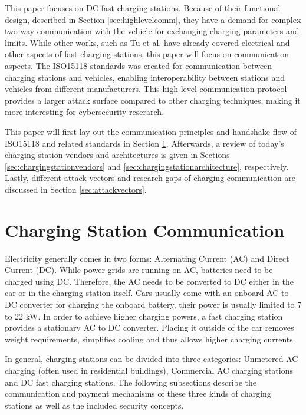 \documentclass[conference,flushend]{iaria} %
\begin{document}
This paper focuses on DC fast charging stations. Because of their functional design, described in Section \ref{sec:highlevelcomm}, they have a demand for complex two-way communication with the vehicle for exchanging charging parameters and limits.
While other works, such as Tu et al. \cite{tu_extreme_2019} have already covered electrical and other aspects of fast charging stations, this paper will focus on communication aspects.
The ISO15118 standards \cite{isoiec_isoiec_2012, isoiec_isoiec_2012-1} was created for communication between charging stations and vehicles, enabling interoperability between stations and vehicles from different manufacturers.
This high level communication protocol provides a larger attack surface compared to other charging techniques, making it more interesting for cybersecurity reserarch.

This paper will first lay out the communication principles and handshake flow of ISO15118 and related standards in Section \ref{sec:chargingcommoverview}.
Afterwards, a review of today's charging station vendors and architectures is given in Sections \ref{sec:chargingstationvendors} and \ref{sec:chargingstationarchitecture}, respectively.
Lastly, different attack vectors and research gaps of charging communication are discussed in Section \ref{sec:attackvectors}.

\section{Charging Station Communication} \label{sec:chargingcommoverview}
Electricity generally comes in two forms: Alternating Current (AC) and Direct Current (DC).
While power grids are running on AC, batteries need to be charged using DC.
Therefore, the AC needs to be converted to DC either in the car or in the charging station itself.
Cars usually come with an onboard AC to DC converter for charging the onboard battery, their power is usually limited to 7 to 22 kW.
In order to achieve higher charging powers, a fast charging station provides a stationary AC to DC converter. Placing it outside of the car removes weight requirements, simplifies cooling and thus allows higher charging currents.

In general, charging stations can be divided into three categories: Unmetered AC charging (often used in residential buildings), Commercial AC charging stations and DC fast charging stations.
The following subsections describe the communication and payment mechanisms of these three kinds of charging stations as well as the included security concepts.
\end{document}
